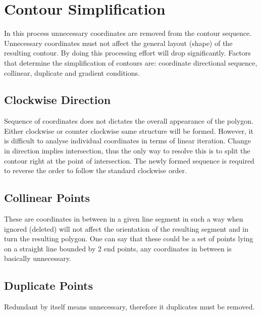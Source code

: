 \documentclass{sig-alternate}
\begin{document}








\section{Contour Simplification}
In this process unnecessary coordinates are removed from the contour sequence. Unnecessary coordinates must not affect the general layout (shape) of the resulting contour. By doing this processing effort will drop significantly. Factors that determine the simplification of contours are: coordinate directional sequence, collinear, duplicate  and gradient conditions.
\subsection{Clockwise Direction}
Sequence of coordinates does not dictates the overall appearance of the polygon. Either clockwise or counter clockwise same structure will be formed. However, it is difficult to analyse individual coordinates in terms of linear iteration. Change in direction implies intersection, thus the only way to resolve this is to split the contour right at the point of intersection. 
The newly formed sequence is required to reverse the order to follow the standard clockwise order. 
\subsection{Collinear Points}
These are coordinates in between in a given line segment in such a way when ignored (deleted) will not affect the orientation of the resulting segment  and in turn the resulting polygon. One can say that these could be a set of points lying on a straight line bounded by 2 end points, any coordinates in between is basically unnecessary.
\subsection{Duplicate Points}
Redundant by itself  means unnecessary, therefore it duplicates must be removed.
\end{document}
